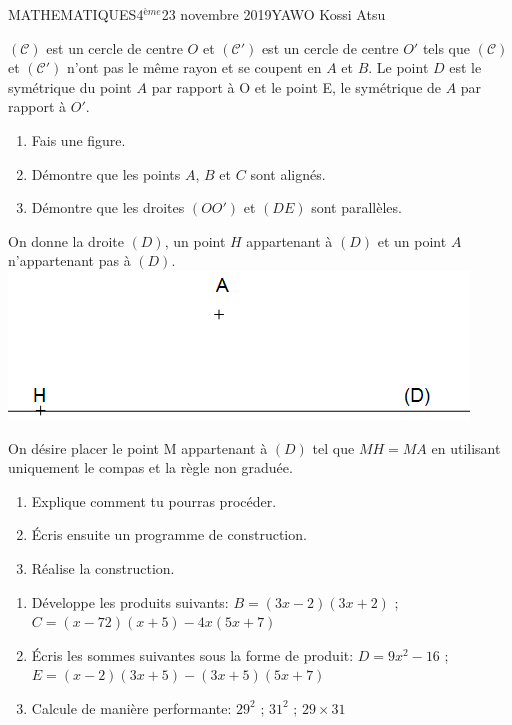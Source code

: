 \documentclass[12pt,a4paper]{book}
\newcommand{\prof}{YAWO Kossi Atsu}
\newcommand{\matiere}{MATHEMATIQUES}
\newcommand{\classe}{4$^{ème}$}
\begin{document}
\newpage
\begin{td}{\matiere}{\classe}{23 novembre 2019}{\prof}
\begin{exo}
$\mathcal{(C)}$ est un cercle de centre $O$ et $\mathcal{(C')}$ est un cercle de centre $O'$ tels que $\mathcal{(C)}$ et $\mathcal{(C')}$ n'ont pas le même rayon et se coupent en $A$ et $B$. Le point $D$ est le symétrique du point $A$ par rapport à O et le point E, le symétrique de $A$ par rapport à $O'$.
\begin{enumerate}
\item Fais une figure.
\item Démontre que les points $A$, $B$ et $C$ sont alignés.
\item Démontre que les droites $(OO')$ et $(DE)$ sont parallèles.
\end{enumerate}
\end{exo}

\vspace{1cm}
\begin{exo}
On donne la droite $(D)$, un point $H$ appartenant à $(D)$ et un point $A$
n'appartenant pas à $(D)$.\\
\includegraphics[scale=0.9]{images/td1img1.png}
\par
On désire placer le point M appartenant à $(D)$ tel que $MH=MA$ en utilisant uniquement le compas et la règle non graduée.
\begin{enumerate}
\item Explique comment tu pourras procéder.
\item Écris ensuite un programme de construction.
\item Réalise la construction.
\end{enumerate}
\end{exo}

\vspace{1cm}

\begin{exo}

\end{exo}

\vspace{1cm}

\begin{exo}
\begin{enumerate}
\item Développe les produits suivants:
$B=(3x-2)(3x+2)$  \qquad ; \qquad $C=(x-72)(x+5)-4x(5x+7)$
\item Écris les sommes suivantes sous la forme de produit:
$D=9x^2-16$  \qquad ; \qquad $E=(x-2)(3x+5)-(3x+5)(5x+7)$
\item Calcule de manière performante:
$29^2$ \qquad ; \qquad $31^2$ \qquad ; \qquad $29 \times 31$ 
\end{enumerate}
\end{exo}
\end{td}
\end{document}

